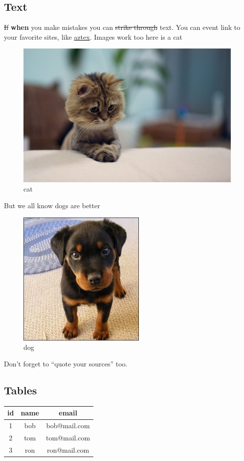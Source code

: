 \documentclass{article}
\begin{document}
\subsection{Text}
\sout{If} \textbf{when} you make mistakes you can \sout{strike through} text.
You can event link to your favorite sites, like \href{http://github.com/thuc289/azTex}{aztex}.
Images work too here is a cat
\begin{figure}[h]
\caption{cat}
\centering
\includegraphics{cat.jpg}
\end{figure}
But we all know dogs are better
\begin{figure}[h]
\caption{dog}
\centering
\includegraphics{dog.jpg}
\end{figure}
Don't forget to ``quote your sources'' too.
\subsection{Tables}
\noindent
\begin{tabular}{| c | c | c |}
\hline 
id
&name
&email
\\
\hline 
1
&bob
&bob@mail.com
\\
\hline 
2
&tom
&tom@mail.com
\\
\hline 
3
&ron
&ron@mail.com
\\
\hline 
\end{tabular}
\end{document}
